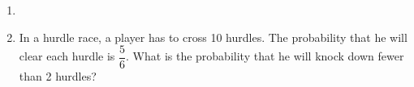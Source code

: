 \begin{enumerate}[label=\thechapter.\arabic*,ref=\thechapter.\theenumi]
\item 
\item In a hurdle race, a player has to cross 10 hurdles. The probability that he will clear each hurdle is $\dfrac{5}{6}$. What is the probability that he will knock down fewer than 2 hurdles?
\end{enumerate}
